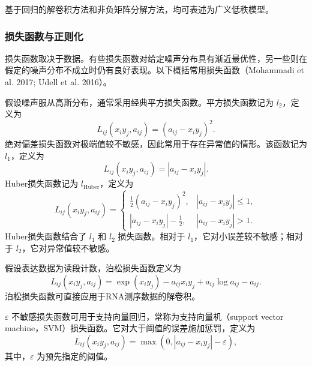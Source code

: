 基于回归的解卷积方法和非负矩阵分解方法，均可表述为广义低秩模型。

\subsubsection{损失函数与正则化}

损失函数取决于数据。有些损失函数对给定噪声分布具有渐近最优性，另一些则在假定的噪声分布不成立时仍有良好表现。以下概括常用损失函数（Mohammadi et al. 2017; Udell et al. 2016）。

假设噪声服从高斯分布，通常采用经典平方损失函数。平方损失函数记为 $l_2$，定义为
\begin{equation}
L_{ij}(x_iy_j,a_{ij})=(a_{ij}-x_iy_j)^2.\tag{4.241}
\end{equation}
绝对偏差损失函数对极端值较不敏感，因此常用于存在异常值的情形。该函数记为 $l_1$，定义为
\begin{equation}
L_{ij}(x_iy_j,a_{ij})=|a_{ij}-x_iy_j|.\tag{4.242}
\end{equation}
Huber损失函数记为 $l_{\mathrm{Huber}}$，定义为
\begin{equation}
L_{ij}(x_iy_j,a_{ij})=
\begin{cases}
\frac12(a_{ij}-x_iy_j)^2,&|a_{ij}-x_iy_j|\le1,\\
|a_{ij}-x_iy_j|-\frac12,&|a_{ij}-x_iy_j|>1.
\end{cases}\tag{4.243}
\end{equation}
Huber损失函数结合了 $l_1$ 和 $l_2$ 损失函数。相对于 $l_1$，它对小误差较不敏感；相对于 $l_2$，它对异常值较不敏感。

假设表达数据为读段计数，泊松损失函数定义为
\begin{equation}
L_{ij}(x_iy_j,a_{ij})=\exp(x_iy_j)-a_{ij}x_iy_j+a_{ij}\log a_{ij}-a_{ij}.\tag{4.244}
\end{equation}
泊松损失函数可直接应用于RNA测序数据的解卷积。

$\varepsilon$ 不敏感损失函数可用于支持向量回归，常称为支持向量机（support vector machine，SVM）损失函数。它对大于阈值的误差施加惩罚，定义为
\begin{equation}
L_{ij}(x_iy_j,a_{ij})=\max(0,|a_{ij}-x_iy_j|-\varepsilon),\tag{4.245}
\end{equation}
其中，$\varepsilon$ 为预先指定的阈值。

